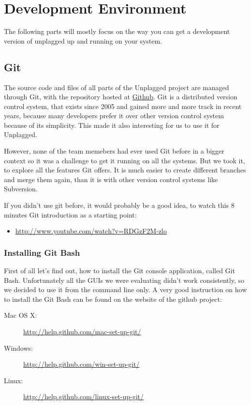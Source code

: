 \section{Development Environment}

The following parts will mostly focus on the way you can get a development version of unplagged up and running on your 
system.

\subsection{Git}
The source code and files of all parts of the Unplagged project are managed through Git, 
with the repository hosted at \href{https://github.com}{Github}. 
Git is a distributed version control system, that exists since 2005 and gained more and more 
track in recent years, because many developers prefer it over other version control system because of its simplicity. This
made it also interesting for us to use it for Unplagged. %

However, none of the team memebers had ever used 
Git before in a bigger context so it was a challenge to get it running on all the systems. But we took it, to explore all the 
features Git offers. It is much easier to create different branches and merge them again, than it is with other 
version control systems like Subversion.

If you didn't use git before, it would probably be a good idea, to watch this 8 minutes Git introduction as a starting point:

\begin{itemize}
\item \url{http://www.youtube.com/watch?v=RDGzF2M-zlo}
\end{itemize}

\subsubsection{Installing Git Bash}

First of all let's find out, how to install the Git console application, called Git Bash. 
Unfortunately all the GUIs we were evaluating didn't work consistently, so we decided to use it from the command line 
only. 
A very good instruction on how to install the Git Bash can be found on the website of the github project:

\begin{description}
\item[Mac OS X:] \url{http://help.github.com/mac-set-up-git/}
\item[Windows:] \url{http://help.github.com/win-set-up-git/}
\item[Linux:] \url{http://help.github.com/linux-set-up-git/}
\end{description}

